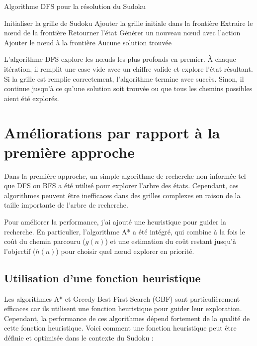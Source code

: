 \documentclass{article}
\begin{document}
\begin{algorithm}[H]
\caption{Algorithme DFS pour la résolution du Sudoku}
\begin{algorithmic}[1]
\STATE Initialiser la grille de Sudoku
\STATE Ajouter la grille initiale dans la frontière
    \STATE Extraire le nœud de la frontière
        \STATE Retourner l'état
    \ENDIF
        \STATE Générer un nouveau nœud avec l'action
        \STATE Ajouter le nœud à la frontière
    \ENDFOR
\ENDWHILE
\STATE Aucune solution trouvée
\end{algorithmic}
\end{algorithm}

L'algorithme DFS explore les nœuds les plus profonds en premier. À chaque itération, il remplit une case vide avec un chiffre valide et explore l'état résultant. Si la grille est remplie correctement, l'algorithme termine avec succès. Sinon, il continue jusqu'à ce qu'une solution soit trouvée ou que tous les chemins possibles aient été explorés.

\section{Améliorations par rapport à la première approche}
Dans la première approche, un simple algorithme de recherche non-informée tel que DFS ou BFS a été utilisé pour explorer l'arbre des états. Cependant, ces algorithmes peuvent être inefficaces dans des grilles complexes en raison de la taille importante de l'arbre de recherche.

Pour améliorer la performance, j'ai ajouté une heuristique pour guider la recherche. En particulier, l'algorithme A* a été intégré, qui combine à la fois le coût du chemin parcouru (\( g(n) \)) et une estimation du coût restant jusqu'à l'objectif (\( h(n) \)) pour choisir quel nœud explorer en priorité.

\subsection{Utilisation d'une fonction heuristique}
Les algorithmes A* et Greedy Best First Search (GBF) sont particulièrement efficaces car ils utilisent une fonction heuristique pour guider leur exploration. Cependant, la performance de ces algorithmes dépend fortement de la qualité de cette fonction heuristique. Voici comment une fonction heuristique peut être définie et optimisée dans le contexte du Sudoku :
\end{document}
